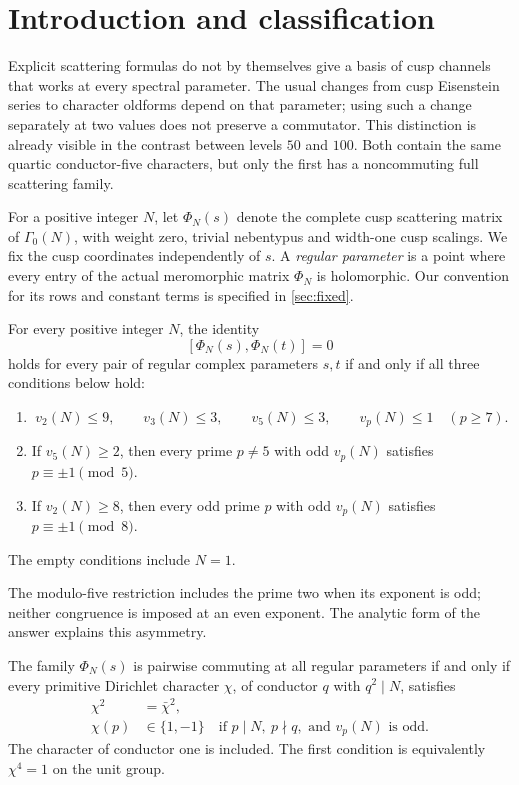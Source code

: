 \section{Introduction and classification}\label{sec:introduction}

Explicit scattering formulas do not by themselves give a basis of cusp
channels that works at every spectral parameter. The usual changes from
cusp Eisenstein series to character oldforms depend on that parameter;
using such a change separately at two values does not preserve a
commutator. This distinction is already visible in the contrast between
levels \(50\) and \(100\). Both contain the same quartic conductor-five
characters, but only the first has a noncommuting full scattering family.

For a positive integer \(N\), let \(\Phi_N(s)\) denote the complete cusp
scattering matrix of \(\Gamma_0(N)\), with weight zero, trivial nebentypus
and width-one cusp scalings. We fix the cusp coordinates independently
of \(s\). A \emph{regular parameter} is a point where every entry of the
actual meromorphic matrix \(\Phi_N\) is holomorphic. Our convention for
its rows and constant terms is specified in \cref{sec:fixed}.

\begin{theorem}\label{thm:levels}
For every positive integer \(N\), the identity
\[
 [\Phi_N(s),\Phi_N(t)]=0
\]
holds for every pair of regular complex parameters \(s,t\) if and only
if all three conditions below hold:
\begin{enumerate}
\item
\[
 v_2(N)\le9,\qquad v_3(N)\le3,\qquad v_5(N)\le3,\qquad
 v_p(N)\le1\quad(p\ge7).
\]
\item If \(v_5(N)\ge2\), then every prime \(p\ne5\) with odd
\(v_p(N)\) satisfies \(p\equiv\pm1\pmod5\).
\item If \(v_2(N)\ge8\), then every odd prime \(p\) with odd
\(v_p(N)\) satisfies \(p\equiv\pm1\pmod8\).
\end{enumerate}
The empty conditions include \(N=1\).
\end{theorem}

The modulo-five restriction includes the prime two when its exponent is
odd; neither congruence is imposed at an even exponent. The analytic
form of the answer explains this asymmetry.

\begin{theorem}\label{thm:characters}
The family \(\Phi_N(s)\) is pairwise commuting at all regular parameters
if and only if every primitive Dirichlet character \(\chi\), of conductor
\(q\) with \(q^2\mid N\), satisfies
\begin{align}
 \chi^2&=\bar\chi^2,\label{eq:real-square-condition}\\
 \chi(p)&\in\{1,-1\}
 \quad\text{if }p\mid N,\ p\nmid q,\text{ and }v_p(N)\text{ is odd}.
 \label{eq:phase-condition}
\end{align}
The character of conductor one is included. The first condition is
equivalently \(\chi^4=1\) on the unit group.
\end{theorem}

